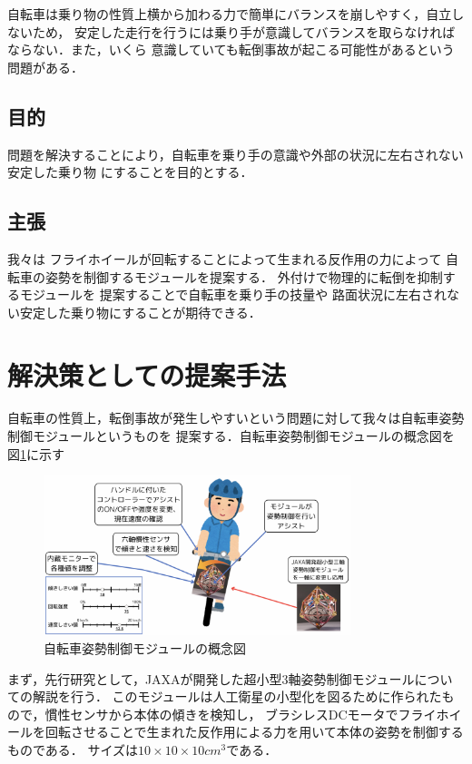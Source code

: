 \documentclass[uplatex,dvipdfmx]{jsarticle}
\begin{document}
自転車は乗り物の性質上横から加わる力で簡単にバランスを崩しやすく，自立しないため，
安定した走行を行うには乗り手が意識してバランスを取らなければならない．また，いくら
意識していても転倒事故が起こる可能性があるという問題がある．

\subsection{目的}

問題を解決することにより，自転車を乗り手の意識や外部の状況に左右されない安定した乗り物
にすることを目的とする．

\subsection{主張}

我々は
フライホイールが回転することによって生まれる反作用の力によって
自転車の姿勢を制御するモジュールを提案する．
外付けで物理的に転倒を抑制するモジュールを
提案することで自転車を乗り手の技量や
路面状況に左右されない安定した乗り物にすることが期待できる．
\section{解決策としての提案手法}

自転車の性質上，転倒事故が発生しやすいという問題に対して我々は自転車姿勢制御モジュールというものを
提案する．自転車姿勢制御モジュールの概念図を図\ref{fig:moduleGainenn}に示す

\begin{figure}[H]
    \centering
    \includegraphics[width=0.8\textwidth]{fig/moduleGainenn2.png}
    \caption{自転車姿勢制御モジュールの概念図}
    \label{fig:moduleGainenn}
\end{figure}

まず，先行研究として，JAXAが開発した超小型3軸姿勢制御モジュールについての解説を行う．
このモジュールは人工衛星の小型化を図るために作られたもので，慣性センサから本体の傾きを検知し，
ブラシレスDCモータでフライホイールを回転させることで生まれた反作用による力を用いて本体の姿勢を制御するものである．
サイズは$10×10×10 {cm}^3$である\cite{jaxaModule}．
\end{document}
